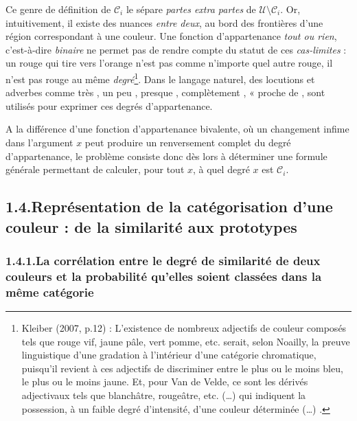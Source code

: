 \documentclass{article}
\begin{document}
Ce genre de définition de $\mathcal{C}_i$ le sépare \textit{partes extra partes} de $\mathcal{U}\setminus\mathcal{C}_i$. Or, intuitivement, il existe des nuances \textit{entre deux}, au bord des frontières d’une région correspondant à une couleur. Une fonction d’appartenance \textit{tout ou rien}, c’est-à-dire \textit{binaire} ne permet pas de rendre compte du statut de ces \textit{cas-limites} : un rouge qui tire vers l’orange n’est pas comme n’importe quel autre rouge, il n’est pas rouge au même \textit{degré}\footnote{Kleiber (2007, p.12) : \og L’existence de nombreux adjectifs de couleur composés tels que rouge vif, jaune pâle, vert pomme, etc. serait, selon Noailly, la preuve linguistique d’une gradation à l’intérieur d’une catégorie chromatique, puisqu’il revient à ces adjectifs de discriminer entre le plus ou le moins bleu, le plus ou le moins jaune. Et, pour Van de Velde, ce sont les dérivés adjectivaux tels que blanchâtre, rougeâtre, etc. (…) qui indiquent la possession, à un faible degré d’intensité, d’une couleur déterminée (…) \fg.}. Dans le langage naturel, des locutions et adverbes comme \og très \fg, \og un peu \fg, \og presque \fg, \og complètement \fg, « proche de \fg, sont utilisés pour exprimer ces degrés d’appartenance.
\par 
A la différence d’une fonction d’appartenance bivalente, où un changement infime dans l’argument $x$ peut produire un renversement complet du degré d’appartenance, le problème consiste donc dès lors à déterminer une formule générale permettant de calculer, pour tout $x$, à quel degré $x$ est $\mathcal{C}_i$.

\subsection*{\hspace{1em}1.4.\hspace{1em}Représentation de la catégorisation d’une couleur : de la similarité aux prototypes}

\subsubsection*{\hspace{1em}1.4.1.\hspace{1em}La corrélation entre le degré de similarité de deux couleurs et la probabilité qu'elles soient classées dans la même catégorie}
\end{document}
